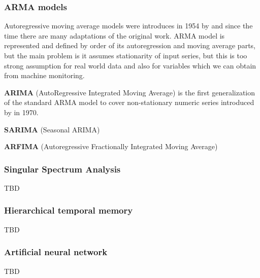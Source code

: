 \subsubsection{ARMA models}

Autoregressive moving average models were introduces in 1954 by \cite{gurland1954hypothesis} and since the time there are many adaptations of the original work. ARMA model is represented and defined by order of its autoregression and moving average parts, but the main problem is it assumes stationarity of input series, but this is too strong assumption for real world data and also for variables which we can obtain from machine monitoring. 

\textbf{ARIMA} (AutoRegressive Integrated Moving Average) is the first generalization of the standard ARMA model to cover non-stationary numeric series introduced by \cite{ge1970box} in 1970. 

\textbf{SARIMA} (Seasonal ARIMA)

\textbf{ARFIMA} (Autoregressive Fractionally Integrated Moving Average)

\cite{kumar2016forecasting}
\cite{akouemo2017data}

\subsubsection{Singular Spectrum Analysis}

TBD
 \cite{kumar2016forecasting}
 
\subsubsection{Hierarchical temporal memory}

TBD
\cite{ahmad2016real}

\subsubsection{Artificial neural network}

TBD
\cite{akouemo2017data}


